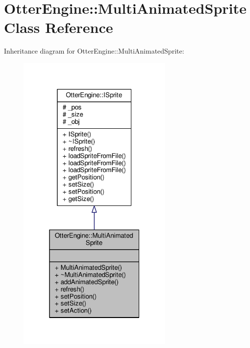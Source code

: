 \hypertarget{class_otter_engine_1_1_multi_animated_sprite}{}\section{Otter\+Engine\+:\+:Multi\+Animated\+Sprite Class Reference}
\label{class_otter_engine_1_1_multi_animated_sprite}


Inheritance diagram for Otter\+Engine\+:\+:Multi\+Animated\+Sprite\+:\nopagebreak
\begin{figure}[H]
\begin{center}
\leavevmode
\includegraphics[width=217pt]{d8/d62/class_otter_engine_1_1_multi_animated_sprite__inherit__graph}
\end{center}
\end{figure}


